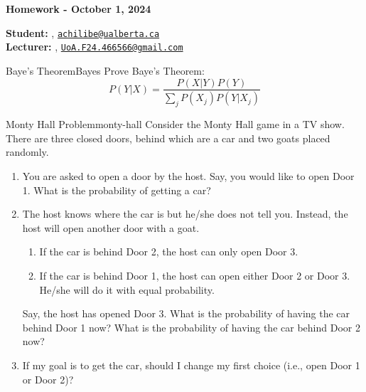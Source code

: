 





\begin{Large}
    \textsf{\textbf{Homework - October 1, 2024}}
\end{Large}

\vspace{1ex}

\textsf{\textbf{Student:}} , \href{mailto:achilibe@ualberta.ca}{\texttt{achilibe@ualberta.ca}}\\
\textsf{\textbf{Lecturer:}} , \href{mailto:UoA.F24.466566@gmail.com}{\texttt{UoA.F24.466566@gmail.com}}


\vspace{2ex}

\begin{problem}{Baye's Theorem}{Bayes}
Prove Baye's Theorem:
\begin{equation*}
  P(Y|X) = \frac{P(X|Y)P(Y)}{\sum_{j}P(X_{j})P(Y|X_{j})}
\end{equation*}
\end{problem}



\begin{problem}{Monty Hall Problem}{monty-hall}
Consider the Monty Hall game in a TV show. There are three closed doors, behind which are a car and two goats placed randomly.

\begin{enumerate}
  \item You are asked to open a door by the host. Say, you would like to open Door 1. What is the probability of getting a car?
  \item The host knows where the car is but he/she does not tell you. Instead, the host will open another door with a goat.
        \begin{enumerate}
          \item If the car is behind Door 2, the host can only open Door 3.
          \item If the car is behind Door 1, the host can open either Door 2 or Door 3. He/she will do it with equal probability.
        \end{enumerate}
        Say, the host has opened Door 3. What is the probability of having the car behind Door 1 now? What is the probability of having the car behind Door 2 now?
  \item If my goal is to get the car, should I change my first choice (i.e., open Door 1 or Door 2)?
\end{enumerate}
\end{problem}

